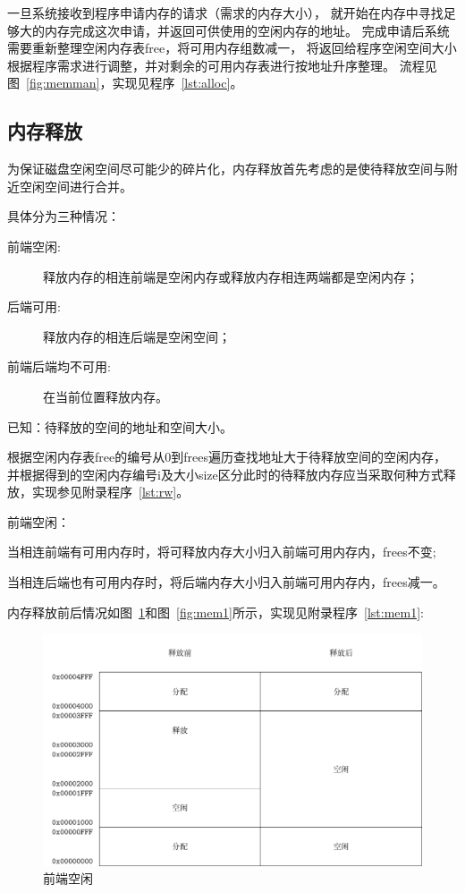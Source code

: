 一旦系统接收到程序申请内存的请求（需求的内存大小），
就开始在内存中寻找足够大的内存完成这次申请，并返回可供使用的空闲内存的地址。
完成申请后系统需要重新整理空闲内存表free，将可用内存组数减一，
将返回给程序空闲空间大小根据程序需求进行调整，并对剩余的可用内存表进行按地址升序整理。
流程见图~\ref{fig:memman}，实现见程序~\ref{lst:alloc}。


\subsection{内存释放}

为保证磁盘空闲空间尽可能少的碎片化，内存释放首先考虑的是使待释放空间与附近空闲空间进行合并\cite{bryant2003computer}。

具体分为三种情况：

\begin{description}
\item[前端空闲:]释放内存的相连前端是空闲内存或释放内存相连两端都是空闲内存；
\item[后端可用:]释放内存的相连后端是空闲空间；
\item[前端后端均不可用:]在当前位置释放内存。
\end{description}

已知：待释放的空间的地址和空间大小。

根据空闲内存表free的编号从0到frees遍历查找地址大于待释放空间的空闲内存，
并根据得到的空闲内存编号i及大小size区分此时的待释放内存应当采取何种方式释放，实现参见附录程序~\ref{lst:rw}。

\newpage
前端空闲：

当相连前端有可用内存时，将可释放内存大小归入前端可用内存内，frees不变;

当相连后端也有可用内存时，将后端内存大小归入前端可用内存内，frees减一。

内存释放前后情况如图~\ref{fig:mem0}和图~\ref{fig:mem1}所示，实现见附录程序~\ref{lst:mem1}: 

\begin{figure}[h]
  \centering
  \includegraphics[width=.7\textwidth]{fig/mem0.pdf}
  \caption{前端空闲}
  \label{fig:mem0}
\end{figure}

